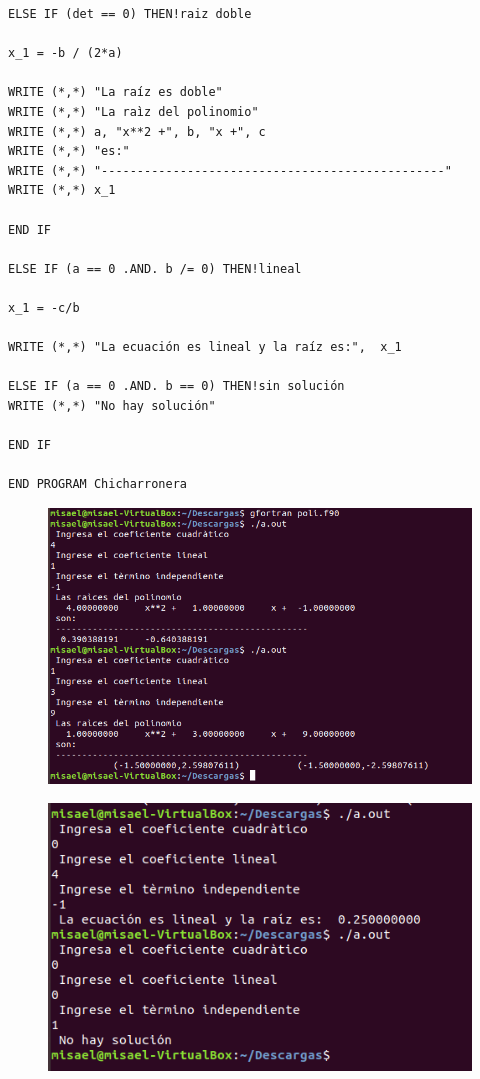 \documentclass[12pt,a4paper]{article}
\begin{document}
\begin{enumerate}
\begin{verbatim}
ELSE IF (det == 0) THEN!raiz doble

x_1 = -b / (2*a)	
	
WRITE (*,*) "La raíz es doble"
WRITE (*,*) "La raìz del polinomio"
WRITE (*,*) a, "x**2 +", b, "x +", c
WRITE (*,*) "es:"
WRITE (*,*) "------------------------------------------------"
WRITE (*,*) x_1
		
END IF

ELSE IF (a == 0 .AND. b /= 0) THEN!lineal

x_1 = -c/b

WRITE (*,*) "La ecuación es lineal y la raíz es:",  x_1

ELSE IF (a == 0 .AND. b == 0) THEN!sin solución
WRITE (*,*) "No hay solución"

END IF

END PROGRAM Chicharronera
    \end{verbatim}
    
    \begin{figure}
        \centering
        \includegraphics[scale = 0.5]{1.1.1.PNG}
    \end{figure}
    
    \begin{figure}
        \centering
        \includegraphics[scale = 0.5]{1.1.2.PNG}
    \end{figure}
    

\end{enumerate}
\end{document}
